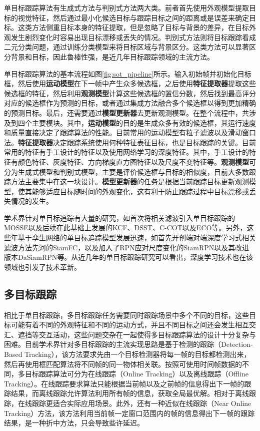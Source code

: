 单目标跟踪算法有生成式方法与判别式方法两大类。前者首先使用外观模型提取目标的视觉特征，然后通过最小化候选目标与跟踪目标之间的距离或是误差来确定目标。这类方法侧重目标本身的特征提取，但是忽略了目标与背景的差异，在目标外观发生剧烈变化时容易出现目标漂移或丢失的情况。判别式方法则将目标跟踪看成二元分类问题，通过训练分类模型来将目标区域与背景区分。这类方法可以显著区分背景和目标，因此鲁棒性强，是近几年目标跟踪领域的主流方法\cite{Wang2015Understanding}。



单目标跟踪算法的基本流程如图\ref{fig:sot_pipeline}所示。输入初始帧并初始化目标框，然后使用\textbf{运动模型}在下一帧中产生众多候选框，之后使用\textbf{特征提取器}提取这些候选框的特征，然后利用\textbf{观测模型}计算这些候选框的置信分数，然后找到最高评分对应的候选框作为预测的目标，或者通过集成方法融合多个候选框以得到更加精确的预测目标。最后，还需要通过\textbf{模型更新器}去更新观测模型。在整个流程中，共涉及到四个主要模块。其中，\textbf{运动模型}的目的是生成众多有效的候选框，其运行速度和质量直接决定了跟踪算法的性能。目前常用的运动模型有粒子滤波以及滑动窗口法。\textbf{特征提取器}决定跟踪系统使用何种特征表征目标，也是目标跟踪的关键。目前常用的特征有手工设计的特征以及使用网络学习的深度特征。其中，手工设计的特征有颜色特征、灰度特征、方向梯度直方图特征以及尺度不变特征等。\textbf{观测模型}可分为生成式模型和判别式模型，主要是评价候选框与目标的相似度，目前大多数跟踪方法主要集中在这一块设计。\textbf{模型更新器}的任务是根据当前跟踪目标更新观测模型，使其能够适应目标随时间的外观变化，这有利于防止跟踪过程中目标漂移或丢失情况的发生。

学术界针对单目标追踪有大量的研究，如首次将相关滤波引入单目标跟踪的MOSSE\cite{bolme2010visual}以及后续在此基础上发展的KCF\cite{henriques2014high}、DSST\cite{danelljan2014accurate}、C-COT\cite{danelljan2016beyond}以及ECO\cite{danelljan2017eco}等。另外，这些年基于孪生网络的单目标追踪模型发展迅速，如首先开创端对端深度学习式相关滤波方法先河的SiamFC\cite{bertinetto2016fully}，以及加入了RPN应对尺度变化的SiamRPN\cite{li2018high}以及其改进版本DaSiamRPN\cite{zhu2018distractor}等。从近几年的单目标跟踪研究可以看出，深度学习技术也在该领域也引发了技术革新。

\subsection{多目标跟踪}
\label{mot}
相比于单目标跟踪，多目标跟踪任务需要同时跟踪场景中多个不同的目标，这些目标可能有着不同的外观特征和不同的运动方式，并且不同目标之间还会发生相互交汇、遮挡等交互活动，这些问题交杂在一起使得多目标跟踪算法的设计十分复杂与困难。目前学术界针对多目标跟踪的主流实现思路是基于检测的跟踪（Detection-Based Tracking），该方法要求先由一个目标检测器将每一帧的目标都检测出来，然后再使用框匹配算法将不同帧的同一物体相关联。按照可使用时间帧数据的不同，多目标跟踪算法可分为在线跟踪（Online Tracking）以及离线跟踪（Offline Tracking）。在线跟踪要求算法只能根据当前帧以及之前帧的信息得出下一帧的跟踪结果，而离线跟踪允许算法利用所有帧的信息，获取全局最优解。相对于离线跟踪，在线跟踪更适合实际应用场景。此外，还有一种近似在线跟踪（Near Online Tracking）方法，该方法利用当前帧一定窗口范围内的帧的信息得出下一帧的跟踪结果，是一种折中方法，只会导致些许延迟。

